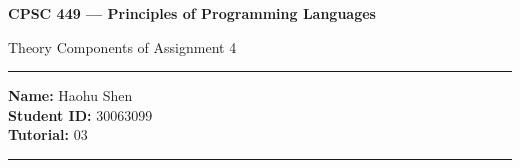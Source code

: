 \documentclass[11pt]{article}
\theoremstyle{definition}
\begin{document}
\begin{center}
{\bf \Large CPSC 449 --- Principles of Programming Languages

Theory Components of Assignment 4}
\end{center}

\newenvironment{titlemize}[1]{%
  \paragraph{#1}
  \begin{itemize}}
  {\end{itemize}}
  
\hrule 	

\textbf{Name:} Haohu Shen \\
\textbf{Student ID:} 30063099 \\
\textbf{Tutorial:} 03 

\medskip \hrule
\end{document}
